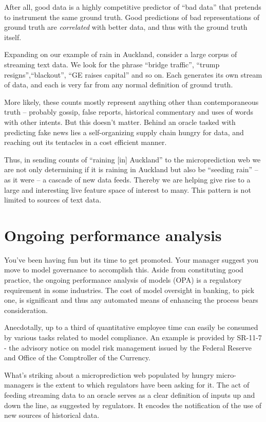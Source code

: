After all, good data is a highly competitive predictor of ``bad data'' that pretends to instrument the same ground truth. Good predictions of bad representations of ground truth are {\em correlated} with better data, and thus with the ground truth itself.  


Expanding on our example of rain in Auckland, consider a large corpus of streaming text data. We look for the phrase ``bridge traffic'', ``trump resigns'',``blackout'', ``GE raises capital'' and so on. Each generates its own stream of data, and each is very far from any normal definition of ground truth. 

More likely, these counts mostly represent anything other than contemporaneous truth -- probably gossip, false reports, historical commentary and uses of words with other intents. But this doesn't matter. Behind an oracle tasked with predicting fake news lies a self-organizing supply chain hungry for data, and reaching out its tentacles in a cost efficient manner. 

Thus, in sending counts of ``raining [in] Auckland'' to the microprediction web we are not only determining if it is raining in Auckland but also be ``seeding rain'' -- as it were -- a cascade of new data feeds. Thereby we are helping give rise to a large and interesting live feature space of interest to many. This pattern is not limited to sources of text data. 


\section{Ongoing performance analysis}
\label{sec:ongoing}

You've been having fun but its time to get promoted. Your manager suggest you move to model governance to accomplish this. Aside from constituting good practice, the ongoing performance analysis of models (OPA) is a regulatory requirement in some industries. The cost of model oversight in banking, to pick one, is significant and thus any automated means of enhancing the process bears consideration. 

Anecdotally, up to a third of quantitative employee time can easily be consumed by various tasks related to model compliance. An example is provided by SR-11-7 - the advisory notice on model risk management issued by the Federal Reserve and Office of the Comptroller of the Currency.


What's striking about a microprediction web populated by hungry micro-managers is the extent to which regulators have been asking for it. The act of feeding streaming data to an oracle serves as a clear definition of inputs up and down the line, as suggested by regulators. It encodes the notification of the use of new sources of historical data.


